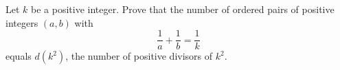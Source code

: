 Let $k$ be a positive integer. Prove that the number of ordered pairs of positive integers $(a,b)$ with
\[
\dfrac{1}{a}+\dfrac{1}{b}=\dfrac{1}{k}
\]
equals $d(k^2)$, the number of positive divisors of $k^2$.
